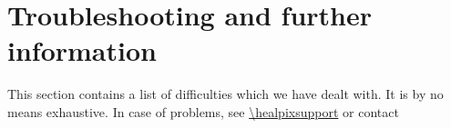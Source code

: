 \documentclass[12pt,twoside]{article}
\begin{document}
\section{Troubleshooting and further information}
\label{sec:troubleshoot}
This section contains a list of difficulties which we have dealt
with. It is by no means exhaustive. 
In case of problems, see \url{\healpixsupport} or contact \healpixmail
\end{document}
